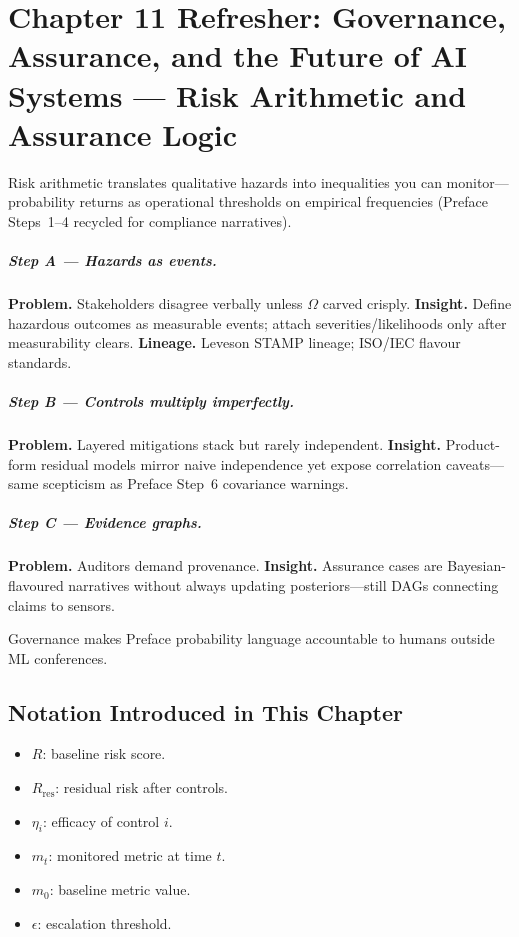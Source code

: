 \chapter{Chapter 11 Refresher: Governance, Assurance, and the Future of AI Systems --- Risk Arithmetic and Assurance Logic}
\label{chap:governance}

\scenelabel
Risk arithmetic translates qualitative hazards into inequalities you can monitor---probability returns as operational thresholds on empirical frequencies (Preface Steps~1--4 recycled for compliance narratives).

\paragraph{Step A --- Hazards as events.}
\textbf{Problem.} Stakeholders disagree verbally unless \(\Omega\) carved crisply.
\textbf{Insight.} Define hazardous outcomes as measurable events; attach severities/likelihoods only after measurability clears.
\textbf{Lineage.} Leveson STAMP lineage; ISO/IEC flavour standards.

\paragraph{Step B --- Controls multiply imperfectly.}
\textbf{Problem.} Layered mitigations stack but rarely independent.
\textbf{Insight.} Product-form residual models mirror naive independence yet expose correlation caveats---same scepticism as Preface Step~6 covariance warnings.

\paragraph{Step C --- Evidence graphs.}
\textbf{Problem.} Auditors demand provenance.
\textbf{Insight.} Assurance cases are Bayesian-flavoured narratives without always updating posteriors---still DAGs connecting claims to sensors.

Governance makes Preface probability language accountable to humans outside ML conferences.

\section*{Notation Introduced in This Chapter}
\begin{itemize}[leftmargin=1.5em]
  \item $R$: baseline risk score.
  \item $R_{\text{res}}$: residual risk after controls.
  \item $\eta_i$: efficacy of control $i$.
  \item $m_t$: monitored metric at time $t$.
  \item $m_0$: baseline metric value.
  \item $\epsilon$: escalation threshold.
\end{itemize}


